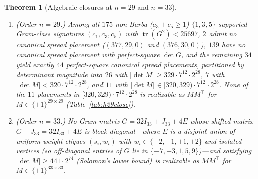 \documentclass[11pt]{article}
\newtheorem{theorem}{Theorem}
\theoremstyle{remark}
\newcommand{\tr}{\operatorname{tr}}
\begin{document}
\begin{theorem}[Algebraic closures at $n = 29$ and $n = 33$]\label{thm:r1_close}
\leavevmode
\begin{enumerate}[leftmargin=*,topsep=2pt,itemsep=1pt]
\item \emph{(Order $n = 29$.)} Among all $175$ non-Barba ($c_3 + c_5 \ge 1$) $\{1, 3, 5\}$-supported Gram-class signatures $(c_1, c_3, c_5)$ with $\tr(G^2) < 25697$, $2$ admit no canonical spread placement ($(377, 29, 0)$ and $(376, 30, 0)$), $139$ have no canonical spread placement with perfect-square $\det G$, and the remaining $34$ yield exactly $44$ perfect-square canonical spread placements, partitioned by determinant magnitude into $26$ with $|\det M| \ge 329 \cdot 7^{12} \cdot 2^{28}$, $7$ with $|\det M| < 320 \cdot 7^{12} \cdot 2^{28}$, and $11$ with $|\det M| \in [320, 329) \cdot 7^{12} \cdot 2^{28}$. None of the $11$ placements in $[320, 329) \cdot 7^{12} \cdot 2^{28}$ is realizable as $M M^\top$ for $M \in \{\pm 1\}^{29 \times 29}$ (Table~\ref{tab:h29close}).
\item \emph{(Order $n = 33$.)} No Gram matrix $G = 32 I_{33} + J_{33} + 4 E$ whose shifted matrix $G - J_{33} = 32 I_{33} + 4 E$ is block-diagonal---where $E$ is a disjoint union of uniform-weight cliques $(s_i, w_i)$ with $w_i \in \{-2, -1, +1, +2\}$ and isolated vertices (so off-diagonal entries of $G$ lie in $\{-7, -3, 1, 5, 9\}$)---and satisfying $|\det M| \ge 441 \cdot 2^{74}$ (Solomon's lower bound) is realizable as $M M^\top$ for $M \in \{\pm 1\}^{33 \times 33}$.
\end{enumerate}
\end{theorem}
\end{document}

